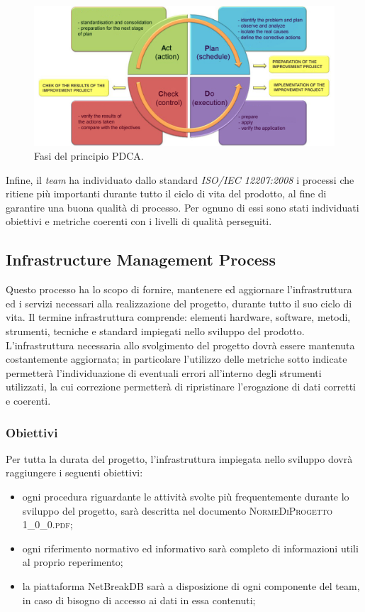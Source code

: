 	\begin{figure}[H]
		\centering
		\includegraphics[scale=0.6]{includes/img/pdca.png}
		\caption{Fasi del principio PDCA.}
	\end{figure}

	Infine, il \textit{team} ha individuato dallo standard \textit{ISO/IEC 12207:2008} i processi che ritiene più importanti durante tutto il ciclo di vita del prodotto, al fine di garantire una buona qualità di processo. Per ognuno di essi sono stati individuati obiettivi e metriche coerenti con i livelli di qualità perseguiti.
	
	\subsection{Infrastructure Management Process}
	Questo processo ha lo scopo di fornire, mantenere ed aggiornare l’infrastruttura ed i servizi necessari alla realizzazione del progetto, durante tutto il suo ciclo di vita. Il termine infrastruttura comprende: elementi hardware, software, metodi, strumenti, tecniche e standard impiegati nello sviluppo del prodotto.
	L’infrastruttura necessaria allo svolgimento del progetto dovrà essere mantenuta costantemente
	aggiornata; in particolare l’utilizzo delle metriche sotto indicate permetterà l’individuazione di
	eventuali errori all’interno degli strumenti utilizzati, la cui correzione permetterà di ripristinare
	l’erogazione di dati corretti e coerenti.
		\subsubsection{Obiettivi}
		Per tutta la durata del progetto, l’infrastruttura impiegata nello sviluppo dovrà raggiungere i seguenti obiettivi:
		\begin{itemize}
			\item ogni procedura riguardante le attività svolte più frequentemente durante lo sviluppo del
			progetto, sarà descritta nel documento \textsc{NormeDiProgetto 1\_0\_0.pdf};
			\item ogni riferimento normativo ed informativo sarà completo di informazioni utili al proprio
			reperimento;
			\item la piattaforma NetBreakDB sarà a disposizione di ogni componente del team, in caso di bisogno di accesso ai dati in essa contenuti;
		\end{itemize}
